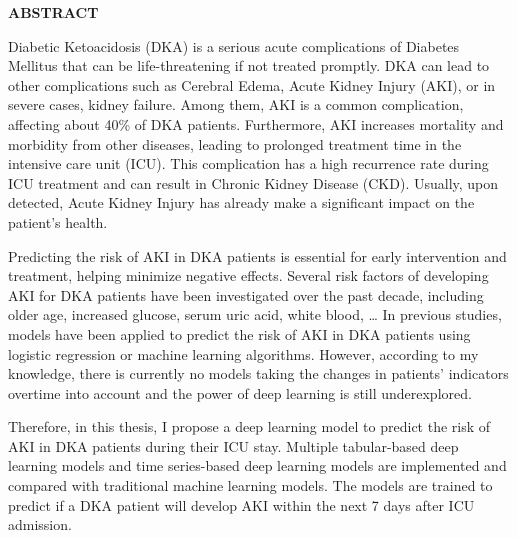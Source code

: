 \documentclass[../main.tex]{subfiles}
\begin{document}
\begin{center}
    \Large{\textbf{ABSTRACT}}\\
\end{center}
\vspace{1cm}

\par Diabetic Ketoacidosis (DKA) is a serious acute complications of Diabetes Mellitus that can be life-threatening if not treated promptly.
DKA can lead to other complications such as Cerebral Edema, Acute Kidney Injury (AKI), or in severe cases, kidney failure.
Among them, AKI is a common complication, affecting about 40\% of DKA patients.
Furthermore, AKI increases mortality and morbidity from other diseases, leading to prolonged treatment time in the intensive care unit (ICU).
This complication has a high recurrence rate during ICU treatment and can result in Chronic Kidney Disease (CKD).
Usually, upon detected, Acute Kidney Injury has already make a significant impact on the patient's health.

\par Predicting the risk of AKI in DKA patients is essential for early intervention and treatment, helping minimize negative effects.
Several risk factors of developing AKI for DKA patients have been investigated over the past decade, including older age, increased glucose, serum uric acid, white blood, \dots
In previous studies, models have been applied to predict the risk of AKI in DKA patients using logistic regression or machine learning algorithms.
However, according to my knowledge, there is currently no models taking the changes in patients' indicators overtime into account and the power of deep learning is still underexplored.

\par Therefore, in this thesis, I propose a deep learning model to predict the risk of AKI in DKA patients during their ICU stay.
Multiple tabular-based deep learning models and time series-based deep learning models are implemented and compared with traditional machine learning models.
The models are trained to predict if a DKA patient will develop AKI within the next 7 days after ICU admission.
\end{document}
